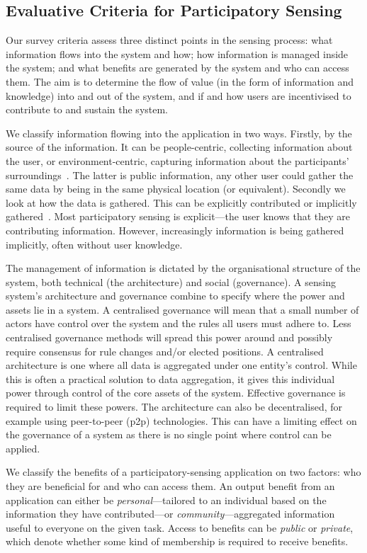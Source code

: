 \subsection{Evaluative Criteria for Participatory Sensing}

Our survey criteria assess three distinct points in the sensing process: what information flows into the system and how; how information is managed inside the system; and what benefits are generated by the system and who can access them. The aim is to determine the flow of value (in the form of information and knowledge) into and out of the system, and if and how users are incentivised to contribute to and sustain the system.

We classify information flowing into the application in two ways. 
Firstly, by the source of the information. It can be people-centric, collecting information about the user, or environment-centric, capturing information about the participants' surroundings~\citep{Kanhere2013}. The latter is public information, any other user could gather the same data by being in the same physical location (or equivalent). Secondly we look at how the data is gathered. This can be explicitly contributed or implicitly gathered~\citep{Shadbolt2013}. Most participatory sensing is explicit---the user knows that they are contributing information. However, increasingly information is being gathered implicitly, often without user knowledge.

The management of information is dictated by the organisational structure of the system, both technical (the architecture) and social (governance). A sensing system's architecture and governance combine to specify where the power and assets lie in a system. A centralised governance will mean that a small number of actors have control over the system and the rules all users must adhere to. Less centralised governance methods will spread this power around and possibly require consensus for rule changes and/or elected positions. A centralised architecture is one where all data is aggregated under one entity's control. 
While this is often a practical solution to data aggregation, it gives this individual power through control of the core assets of the system. 
Effective governance is required to limit these powers. The architecture can also be decentralised, for example using peer-to-peer (p2p) technologies. This can have a limiting effect on the governance of a system as there is no single point where control can be applied. 

We classify the benefits of a participatory-sensing application on two factors: who they are beneficial for and who can access them. 
An output benefit from an application can either be \emph{personal}---tailored to an individual based on the information they have contributed---or \emph{community}---aggregated information useful to everyone on the given task. 
Access to benefits can be \emph{public} or \emph{private}, which denote whether some kind of membership is required to receive benefits.

